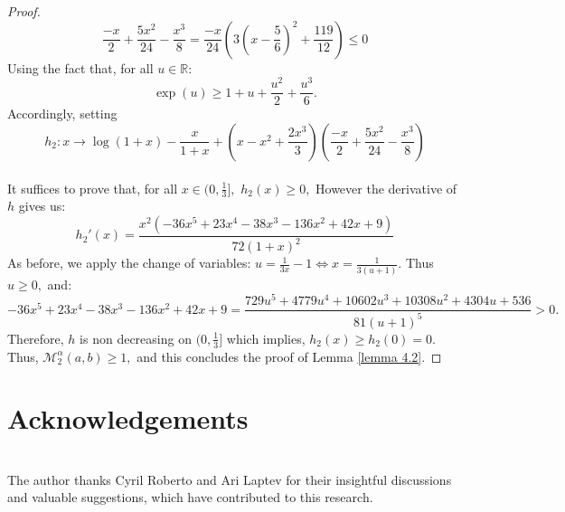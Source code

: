 \documentclass[11pt]{amsart}
\newcommand{\1}{[1]}
\begin{document}
\begin{proof}
$$\frac{-x}{2} + \frac{5x^2}{24} - \frac{x^3}{8} = \frac{-x}{24} \left( 3\left(x - \frac{5}{6}\right)^2 + \frac{119}{12} \right) \leq 0$$
Using the fact that, for all $ u \in \mathbb{R} $:
$$
\exp(u) \geq 1 + u + \frac{u^2}{2} + \frac{u^3}{6}.
$$
Accordingly, setting
$$ h_{2}: x \to  \log(1+x)
-\frac{x}{1+x} +  \left( x-x^2+ \frac{2x^3}{3} \right)  \left( \frac{-x}{2} + \frac{5x^2}{24} -\frac{x^3}{8} \right)$$ 
\\
It suffices to prove that, for all $x \in (0,\frac{1}{3}],$ $h_{2}(x) \geq 0,$ However the derivative of $h$ gives us: \\
$$h_{2}'(x) = \frac{x^2 \left( -36 x^5 + 23 x^4 - 38 x^3 - 136 x^2 + 42 x + 9 \right)}{72 (1 + x)^2}
$$
As before, we apply the change of variables: $u = \frac{1}{3x} - 1 \Leftrightarrow x = \frac{1}{3(u + 1)}.$ Thus $u \geq 0,$ and:
$$-36 x^5 + 23 x^4 - 38 x^3 - 136 x^2 + 42 x + 9 = \frac{729 u^5 + 4779 u^4 + 10602 u^3 + 10308 u^2 + 4304 u + 536}{81 (u + 1)^5} > 0.$$
Therefore, $h$ is non decreasing on $(0,\frac{1}{3}]$ which implies, $h_{2}(x) \geq h_{2}(0)=0.$ Thus, $\mathcal{M}_{2}^{\alpha} (a,b) \geq 1,$ and this concludes the proof of  Lemma \ref{lemma 4.2}.
\end{proof}
\section*{Acknowledgements} 
\phantom{.}\\
The author thanks Cyril Roberto and Ari Laptev for their insightful discussions and valuable suggestions, which have contributed to this research.



\end{document}
